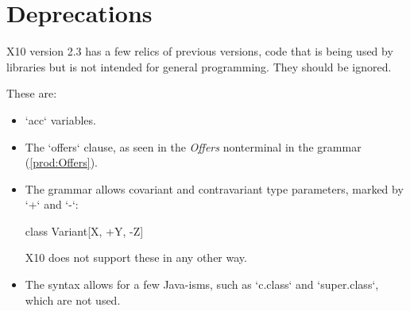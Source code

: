 \chapter{Deprecations}

X10 version 2.3 has a few relics of previous versions, code that is being used
by libraries but is not intended for general programming.    They should be
ignored.

These are: 

\begin{itemize}

\item \xcd`acc` variables. 

\item The \xcd`offers` clause, as seen in the {\it Offers} nonterminal in the
      grammar (\ref{prod:Offers}).

\item The grammar allows covariant and contravariant type parameters, marked
      by \xcd`+` and \xcd`-`: 
\begin{xtenmath}
class Variant[X, +Y, -Z] {}
\end{xtenmath}
      X10 does not support these in any other way.  

\item The syntax allows for a few Java-isms, such as \xcd`c.class` and
      \xcd`super.class`, which are not used.

\end{itemize}
